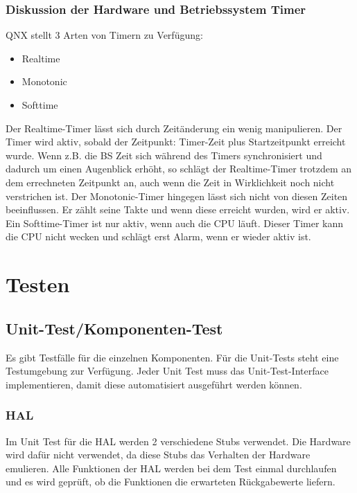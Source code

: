 \documentclass[oneside,a4paper,titlepage]{scrartcl} %
\begin{document}
\newpage

 \subsubsection{Diskussion der Hardware und Betriebssystem Timer}
   QNX stellt 3 Arten von Timern zu Verfügung:
   \begin{itemize}
    \item Realtime
    \item Monotonic
    \item Softtime
   \end{itemize}
   Der Realtime-Timer lässt sich durch Zeitänderung ein wenig manipulieren. Der Timer wird aktiv, sobald der Zeitpunkt: Timer-Zeit plus Startzeitpunkt erreicht wurde.
   Wenn z.B. die BS Zeit sich während des Timers synchronisiert und dadurch um einen Augenblick erhöht, so schlägt der Realtime-Timer trotzdem an dem errechneten Zeitpunkt an, auch wenn die Zeit in Wirklichkeit noch nicht verstrichen ist.\newline
   Der Monotonic-Timer hingegen lässt sich nicht von diesen Zeiten beeinflussen. Er zählt seine Takte und wenn diese erreicht wurden, wird er aktiv.\newline
   Ein Softtime-Timer ist nur aktiv, wenn auch die CPU läuft. Dieser Timer kann die CPU nicht wecken und schlägt erst Alarm, wenn er wieder aktiv ist.\newline

\section{Testen}

\subsection{Unit-Test/Komponenten-Test}
Es gibt Testfälle für die einzelnen Komponenten. Für die Unit-Tests steht eine Testumgebung zur Verfügung.
Jeder Unit Test muss das Unit-Test-Interface implementieren, damit diese automatisiert ausgeführt werden
können.

\subsubsection{HAL}
Im Unit Test für die HAL werden 2 verschiedene Stubs verwendet. Die Hardware wird dafür nicht verwendet,
da diese Stubs das Verhalten der Hardware emulieren. Alle Funktionen der HAL werden bei dem Test einmal durchlaufen
und es wird geprüft, ob die Funktionen die erwarteten Rückgabewerte liefern.
\end{document}
